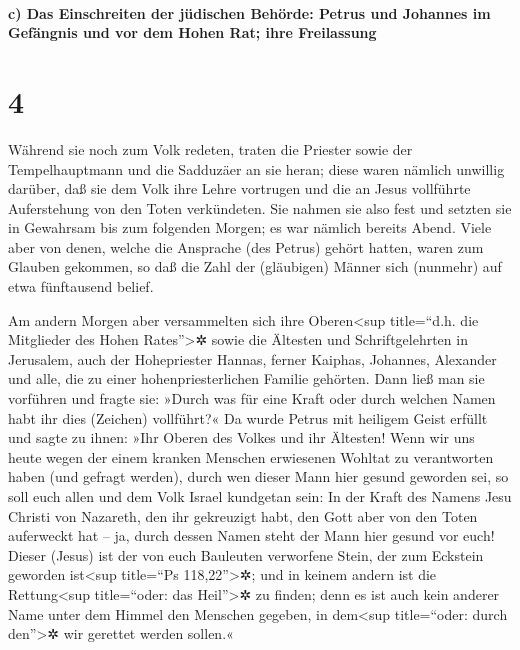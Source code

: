 \hypertarget{c-das-einschreiten-der-juxfcdischen-behuxf6rde-petrus-und-johannes-im-gefuxe4ngnis-und-vor-dem-hohen-rat-ihre-freilassung}{%
\paragraph{c) Das Einschreiten der jüdischen Behörde: Petrus und
Johannes im Gefängnis und vor dem Hohen Rat; ihre
Freilassung}\label{c-das-einschreiten-der-juxfcdischen-behuxf6rde-petrus-und-johannes-im-gefuxe4ngnis-und-vor-dem-hohen-rat-ihre-freilassung}}

\hypertarget{section-3}{%
\section{4}\label{section-3}}

 Während sie noch zum Volk redeten, traten die Priester
sowie der Tempelhauptmann und die Sadduzäer an sie heran; 
diese waren nämlich unwillig darüber, daß sie dem Volk ihre Lehre
vortrugen und die an Jesus vollführte Auferstehung von den Toten
verkündeten.  Sie nahmen sie also fest und setzten sie in
Gewahrsam bis zum folgenden Morgen; es war nämlich bereits Abend.
 Viele aber von denen, welche die Ansprache (des Petrus)
gehört hatten, waren zum Glauben gekommen, so daß die Zahl der
(gläubigen) Männer sich (nunmehr) auf etwa fünftausend belief.

 Am andern Morgen aber versammelten sich ihre
Oberen\textless sup title=``d.h. die Mitglieder des Hohen
Rates''\textgreater✲ sowie die Ältesten und Schriftgelehrten in
Jerusalem,  auch der Hohepriester Hannas, ferner Kaiphas,
Johannes, Alexander und alle, die zu einer hohenpriesterlichen Familie
gehörten.  Dann ließ man sie vorführen und fragte sie:
»Durch was für eine Kraft oder durch welchen Namen habt ihr dies
(Zeichen) vollführt?«  Da wurde Petrus mit heiligem Geist
erfüllt und sagte zu ihnen: »Ihr Oberen des Volkes und ihr Ältesten!
 Wenn wir uns heute wegen der einem kranken Menschen
erwiesenen Wohltat zu verantworten haben (und gefragt werden), durch wen
dieser Mann hier gesund geworden sei,  so soll euch allen
und dem Volk Israel kundgetan sein: In der Kraft des Namens Jesu Christi
von Nazareth, den ihr gekreuzigt habt, den Gott aber von den Toten
auferweckt hat -- ja, durch dessen Namen steht der Mann hier gesund vor
euch!  Dieser (Jesus) ist der von euch Bauleuten
verworfene Stein, der zum Eckstein geworden ist\textless sup title=``Ps
118,22''\textgreater✲;  und in keinem andern ist die
Rettung\textless sup title=``oder: das Heil''\textgreater✲ zu finden;
denn es ist auch kein anderer Name unter dem Himmel den Menschen
gegeben, in dem\textless sup title=``oder: durch den''\textgreater✲ wir
gerettet werden sollen.«


